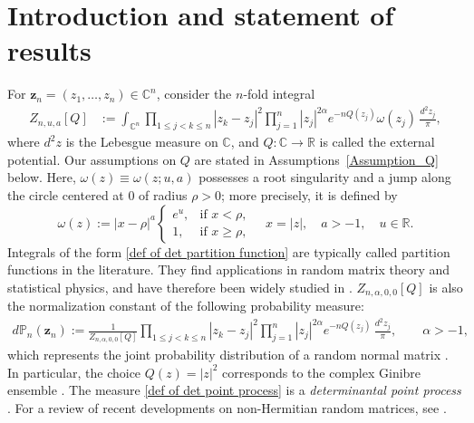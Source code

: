 \documentclass[reqno]{amsart}
\newcommand{\1}{\mathds{1}}
\newcommand{\C}{\mathds{C}}
\newcommand{\R}{\mathds{R}}
\numberwithin{equation}{section}
\theoremstyle{definition}
\begin{document}
\section{Introduction and statement of results}\label{section: introduction}
For $\boldsymbol{z}_n=(z_1,\dots,z_n)\in\C^n$, consider the $n$-fold integral 
\begin{align}
\label{def of det partition function}
Z_{n,u,a}[Q]&:=\int_{\C^n}\prod_{1\leq j<k\leq n}|z_{k} -z_{j}|^{2}\prod_{j=1}^n |z_{j}|^{2\alpha}e^{-nQ(z_j)}\omega(z_j)\,\frac{d^2z_j}{\pi}, 
\end{align}
where $d^2z$ is the Lebesgue measure on $\C$, and $Q:\C\to\R$ is called the external potential.
Our assumptions on $Q$ are stated in Assumptions~\ref{Assumption_Q} below.
Here, $\omega(z)\equiv\omega(z;u,a)$ possesses a root singularity and a jump along the circle centered at 0 of radius $\rho>0$; more precisely, it is defined by 
\begin{equation}
\label{def of omega}
\omega(z):=|x-\rho|^{a}\begin{cases}
    e^{u}, & \mbox{if }x<\rho, \\
    1, & \mbox{if } x\geq \rho,
\end{cases}   
\quad x=|z|,\quad a>-1,\quad u\in\R. 
\end{equation}
Integrals of the form \eqref{def of det partition function} are typically called partition functions in the literature. They find applications in random matrix theory and statistical physics, and have therefore been widely studied in \cite{AFLS25,ACC2023c,Byun25,BFL25,BKS2023,BKSY2025,BSY2025,LS2017,WebbWong}. $Z_{n,\alpha,0,0}[Q]$ is also the normalization constant of the following probability measure:
\begin{align}\label{def of det point process}
d\mathbb{P}_{n}(\boldsymbol{z}_n):=\frac{1}{Z_{n,\alpha,0,0}[Q]} \prod_{1 \leq j < k \leq n} |z_{k} -z_{j}|^{2} \prod_{j=1}^{n}|z_{j}|^{2\alpha}e^{-n Q(z_{j})}\,\frac{d^2z_j}{\pi},\qquad \alpha>-1,
\end{align}
which represents the joint probability distribution of a random normal matrix \cite{BFreview,Mehta,Forrester}.
In particular, the choice $Q(z)=|z|^2$ corresponds to the complex Ginibre ensemble \cite{Ginibre}.
The measure \eqref{def of det point process} is a {\it determinantal point process} \cite{Forrester}. For a review of recent developments on non-Hermitian random matrices, see \cite{BFreview}.
\end{document}
